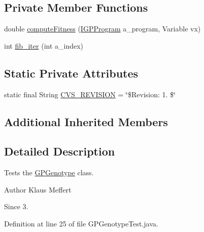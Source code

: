 \subsection*{Private Member Functions}
\begin{DoxyCompactItemize}
\item 
double \hyperlink{classorg_1_1jgap_1_1gp_1_1impl_1_1_g_p_genotype_test_a8e7d36c2dee04486ab0516c59ce6ec37}{compute\-Fitness} (\hyperlink{interfaceorg_1_1jgap_1_1gp_1_1_i_g_p_program}{I\-G\-P\-Program} a\-\_\-program, Variable vx)
\item 
int \hyperlink{classorg_1_1jgap_1_1gp_1_1impl_1_1_g_p_genotype_test_a7aecf298c0101f1eb94920742e0fbc4b}{fib\-\_\-iter} (int a\-\_\-index)
\end{DoxyCompactItemize}
\subsection*{Static Private Attributes}
\begin{DoxyCompactItemize}
\item 
static final String \hyperlink{classorg_1_1jgap_1_1gp_1_1impl_1_1_g_p_genotype_test_a2c7d789bab34cf450ef8c9218d6e3f93}{C\-V\-S\-\_\-\-R\-E\-V\-I\-S\-I\-O\-N} = \char`\"{}\$Revision\-: 1. \$\char`\"{}
\end{DoxyCompactItemize}
\subsection*{Additional Inherited Members}


\subsection{Detailed Description}
Tests the \hyperlink{classorg_1_1jgap_1_1gp_1_1impl_1_1_g_p_genotype}{G\-P\-Genotype} class.

\begin{DoxyAuthor}{Author}
Klaus Meffert 
\end{DoxyAuthor}
\begin{DoxySince}{Since}
3. 
\end{DoxySince}


Definition at line 25 of file G\-P\-Genotype\-Test.\-java.



